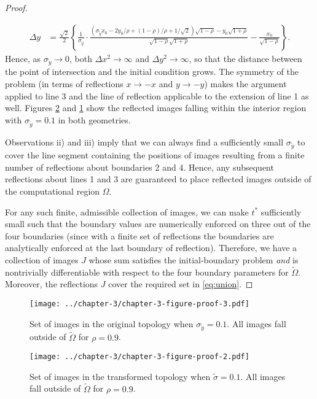 \begin{proof}
\begin{enumerate}
\begin{align*}
      \Delta y &= \frac{\sqrt{2}}{2} \left\{ \frac{1}{\sigma_{\tilde{y}}}\cdot\frac{(\sigma_{\tilde{y}}x_0 - 2y_0/\rho + (1-\rho)/\rho + 1/\sqrt{2})\sqrt{1-\rho} - y_0\sqrt{1+\rho}}{\sqrt{1-\rho}\sqrt{1+\rho}}- \frac{x_0}{\sqrt{1-\rho}} \right\}.
    \end{align*}
    Hence, as $\sigma_{\tilde{y}} \to 0$, both $\Delta x^2 \to \infty$ and
    $\Delta y^2 \to \infty$, so that the distance between the point of
    intersection and the initial condition grows. The symmetry of the problem (in
    terms of reflections $x \to -x$ and $y \to -y$) makes the argument
    applied to line 3 and the line of reflection applicable to the
    extension of line 1 as well. Figures \ref{fig:proof-2} and
    \ref{fig:proof-3} show the reflected images falling within the
    interior region with $\sigma_{\tilde{y}} = 0.1$ in both geometries.
  \end{enumerate}
  Observations ii) and iii) imply that we can always find a
  sufficiently small $\sigma_{\tilde{y}}$ to cover the line segment
  containing the positions of images resulting from a finite number of
  reflections about boundaries 2 and 4.  Hence, any subsequent
  reflections about lines 1 and 3 are guaranteed to place reflected
  images outside of the computational region $\Omega$.

  For any such finite, admissible collection of images, we can make
  $t^*$ sufficiently small such that the boundary values are
  numerically enforced on three out of the four boundaries (since with
  a finite set of reflections the boundaries are analytically enforced at the
  last boundary of reflection). Therefore, we have a collection of
  images $J$ whose sum satisfies the initial-boundary problem
  \textit{and} is nontrivially differentiable with respect to the four
  boundary parameters for $\tilde{\Omega}$. Moreover, the reflections
  $J$ cover the required set in \eqref{eq:union}.
\end{proof}

\begin{figure}
  \centering
  \texttt{[image: ../chapter-3/chapter-3-figure-proof-3.pdf]}
  \caption{Set of images in the original topology when
    $\sigma_{\tilde{y}} = 0.1$. All images fall outside of
    $\tilde{\Omega}$ for $\rho = 0.9$.}
  \label{fig:proof-3}
\end{figure}


\begin{figure}
      \centering
      \texttt{[image: ../chapter-3/chapter-3-figure-proof-2.pdf]}
      \caption{Set of images in the transformed topology when
        $\tilde{\sigma} = 0.1$. All images fall outside of $\tilde{\Omega}$
        for $\rho = 0.9$.}
      \label{fig:proof-2}
\end{figure}

